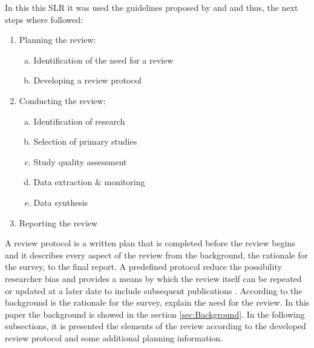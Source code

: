 In this this \acrfull{SLR} it was used the guidelines proposed by \citet{Kitchenham2004} and \citet{Kitchenham2007} and thus, the next steps where followed:

\begin{enumerate}
\item Planning the review:
	\begin{enumerate}[a)] %
	\item Identification of the need for a review
    \item Developing a review protocol
	\end{enumerate}
\item Conducting the review:
	\begin{enumerate}[a)] %
	\item Identification of research
    \item Selection of primary studies
    \item Study quality assessment
    \item Data extraction \& monitoring
    \item Data synthesis
	\end{enumerate}
\item Reporting the review
\end{enumerate}

A review protocol is a written plan that is completed before the review begins and it describes every aspect of the review from the background, the rationale for the survey, to the final report. A predefined protocol reduce the possibility researcher bias and provides a means by which the review itself can be repeated or updated at a later date to include subsequent publications  \cite{Lane2011,Kitchenham2004}. According to \citet{Kitchenham2004} the background is the rationale for the survey, explain the need for the review. In this paper the background is showed in the section \ref{sec:Background}. In the following subsections, it is presented the elements of the review according to the developed review protocol and some additional planning information.



